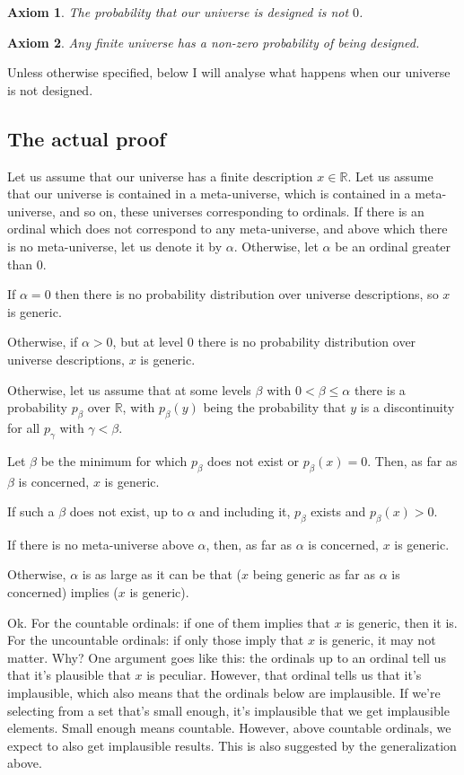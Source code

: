 \documentclass[a4paper
,draft
]{article}
\def\reale{\mathbb{R}}
\newtheorem{axiom}{Axiom}
\begin{document}
\begin{axiom}
The probability that our universe is designed is not $0$.
\end{axiom}

\begin{axiom}
Any finite universe has a non-zero probability of being designed.
\end{axiom}

Unless otherwise specified, below I will analyse what happens when our
universe is not designed.

\subsection {The actual proof}
Let us assume that our universe has a finite description $x\in\reale$. Let us
assume that our universe is contained in a meta-universe, which is contained in
a meta-universe, and so on, these universes corresponding to ordinals. If there
is an ordinal which does not correspond to any meta-universe, and above which
there is no meta-universe, let us denote it by $\alpha$. Otherwise, let
$\alpha$ be an ordinal greater than $0$.

If $\alpha = 0$ then there is no probability distribution over universe
descriptions, so $x$ is generic.

Otherwise, if $\alpha > 0$, but at level $0$ there is no probability
distribution over universe descriptions, $x$ is generic.

Otherwise, let us assume that at some levels $\beta$ with
$0 < \beta \le \alpha$ there is a probability
$p_\beta$ over $\reale$, with $p_\beta(y)$ being the probability that $y$ is
a discontinuity for all $p_\gamma$ with $\gamma < \beta$.

Let $\beta$ be the minimum for which $p_\beta$ does not exist or
$p_\beta(x) = 0$. Then, as far as $\beta$ is concerned, $x$ is generic.

If such a $\beta$ does not exist, up to $\alpha$ and including it,
$p_\beta$ exists and $p_\beta(x) > 0$.

If there is no meta-universe above $\alpha$, then, as far as $\alpha$ is
concerned, $x$ is generic.

Otherwise, $\alpha$ is as large as it can be that ($x$ being generic as far as
$\alpha$ is concerned) implies ($x$ is generic).

Ok. For the countable ordinals: if one of them implies that $x$ is generic,
then it is. For the uncountable ordinals: if only those imply that $x$ is
generic, it may not matter. Why? One argument goes like this: the ordinals up
to an ordinal tell us that it's plausible that $x$ is peculiar. However, that
ordinal tells us that it's implausible, which also means that the ordinals below
are implausible. If we're selecting from a set that's small enough,
it's implausible that we get implausible elements. Small enough means countable.
However, above countable ordinals, we expect to also get implausible results.
This is also suggested by the generalization above.
\end{document}
